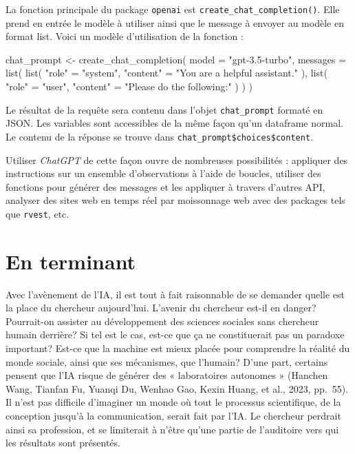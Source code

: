 \documentclass[
  letterpaper,
  DIV=11,
  numbers=noendperiod,
  oneside]{scrreprt}
\newenvironment{Shaded}{\begin{snugshade}}{\end{snugshade}}
\newcommand{\AttributeTok}[1]{\textcolor[rgb]{0.40,0.45,0.13}{#1}}
\newcommand{\FunctionTok}[1]{\textcolor[rgb]{0.28,0.35,0.67}{#1}}
\newcommand{\NormalTok}[1]{\textcolor[rgb]{0.00,0.23,0.31}{#1}}
\newcommand{\OtherTok}[1]{\textcolor[rgb]{0.00,0.23,0.31}{#1}}
\newcommand{\StringTok}[1]{\textcolor[rgb]{0.13,0.47,0.30}{#1}}
\begin{document}
La fonction principale du package \texttt{openai} est
\texttt{create\_chat\_completion()}. Elle prend en entrée le modèle à
utiliser ainsi que le message à envoyer au modèle en format list. Voici
un modèle d'utilisation de la fonction :

\begin{Shaded}
\begin{Highlighting}[]
\NormalTok{chat\_prompt }\OtherTok{\textless{}{-}} \FunctionTok{create\_chat\_completion}\NormalTok{(}
  \AttributeTok{model =} \StringTok{"gpt{-}3.5{-}turbo"}\NormalTok{,}
  \AttributeTok{messages =} \FunctionTok{list}\NormalTok{(}
    \FunctionTok{list}\NormalTok{(}
      \StringTok{"role"} \OtherTok{=} \StringTok{"system"}\NormalTok{,}
      \StringTok{"content"} \OtherTok{=} \StringTok{"You are a helpful}
\StringTok{        assistant."}
\NormalTok{    ),}
    \FunctionTok{list}\NormalTok{(}
      \StringTok{"role"} \OtherTok{=} \StringTok{"user"}\NormalTok{,}
      \StringTok{"content"} \OtherTok{=} \StringTok{"Please do the following:"}
\NormalTok{    )}
\NormalTok{  )}
\NormalTok{)}
\end{Highlighting}
\end{Shaded}

Le résultat de la requête sera contenu dans l'objet
\texttt{chat\_prompt} formaté en JSON. Les variables sont accessibles de
la même façon qu'un dataframe normal. Le contenu de la réponse se trouve
dans \texttt{chat\_prompt\$choices\$content}.

Utiliser \emph{ChatGPT} de cette façon ouvre de nombreuses possibilités
: appliquer des instructions sur un ensemble d'observations à l'aide de
boucles, utiliser des fonctions pour générer des messages et les
appliquer à travers d'autres API, analyser des sites web en temps réel
par moissonnage web avec des packages tels que \texttt{rvest}, etc.

\hypertarget{en-terminant-8}{%
\section{En terminant}\label{en-terminant-8}}

Avec l'avènement de l'IA, il est tout à fait raisonnable de se demander
quelle est la place du chercheur aujourd'hui. L'avenir du chercheur
est-il en danger? Pourrait-on assister au développement des sciences
sociales sans chercheur humain derrière? Si tel est le cas, est-ce que
ça ne constituerait pas un paradoxe important? Est-ce que la machine est
mieux placée pour comprendre la réalité du monde sociale, ainsi que ses
mécanismes, que l'humain? D'une part, certains pensent que l'IA risque
de générer des « laboratoires autonomes » (Hanchen Wang, Tianfan Fu,
Yuanqi Du, Wenhao Gao, Kexin Huang, et al., 2023, pp.~55). Il n'est pas
difficile d'imaginer un monde où tout le processus scientifique, de la
conception jusqu'à la communication, serait fait par l'IA. Le chercheur
perdrait ainsi sa profession, et se limiterait à n'être qu'une partie de
l'auditoire vers qui les résultats sont présentés.
\end{document}
